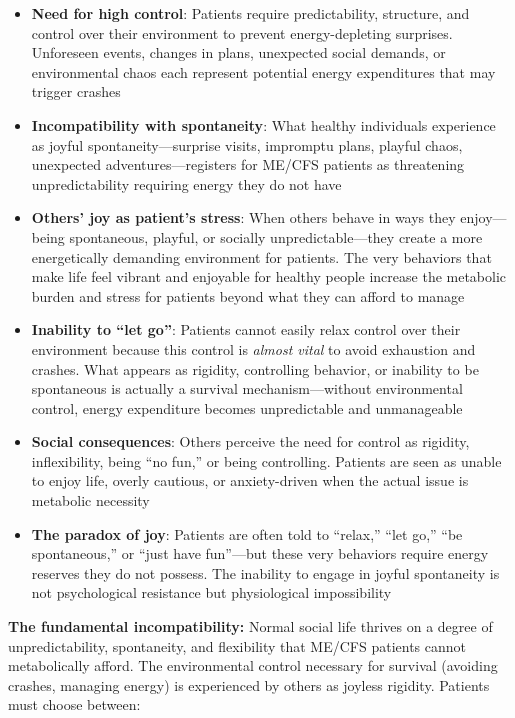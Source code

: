 \begin{itemize}
    \item \textbf{Need for high control}: Patients require predictability, structure, and control over their environment to prevent energy-depleting surprises. Unforeseen events, changes in plans, unexpected social demands, or environmental chaos each represent potential energy expenditures that may trigger crashes

    \item \textbf{Incompatibility with spontaneity}: What healthy individuals experience as joyful spontaneity---surprise visits, impromptu plans, playful chaos, unexpected adventures---registers for ME/CFS patients as threatening unpredictability requiring energy they do not have

    \item \textbf{Others' joy as patient's stress}: When others behave in ways they enjoy---being spontaneous, playful, or socially unpredictable---they create a more energetically demanding environment for patients. The very behaviors that make life feel vibrant and enjoyable for healthy people increase the metabolic burden and stress for patients beyond what they can afford to manage

    \item \textbf{Inability to ``let go''}: Patients cannot easily relax control over their environment because this control is \textit{almost vital} to avoid exhaustion and crashes. What appears as rigidity, controlling behavior, or inability to be spontaneous is actually a survival mechanism---without environmental control, energy expenditure becomes unpredictable and unmanageable

    \item \textbf{Social consequences}: Others perceive the need for control as rigidity, inflexibility, being ``no fun,'' or being controlling. Patients are seen as unable to enjoy life, overly cautious, or anxiety-driven when the actual issue is metabolic necessity

    \item \textbf{The paradox of joy}: Patients are often told to ``relax,'' ``let go,'' ``be spontaneous,'' or ``just have fun''---but these very behaviors require energy reserves they do not possess. The inability to engage in joyful spontaneity is not psychological resistance but physiological impossibility
\end{itemize}

\textbf{The fundamental incompatibility:} Normal social life thrives on a degree of unpredictability, spontaneity, and flexibility that ME/CFS patients cannot metabolically afford. The environmental control necessary for survival (avoiding crashes, managing energy) is experienced by others as joyless rigidity. Patients must choose between:

